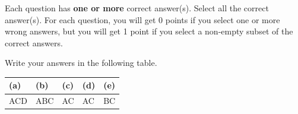 
Each question has \textbf{one or more} correct answer(s). Select all the correct answer(s). For each question, you will get 0 points if you select one or more wrong answers, but you will get 1 point if you select a non-empty subset of the correct answers.

Write your answers in the following table.

\begin{table}[h]
    \centering
    \renewcommand{\arraystretch}{1.25}
    \begin{tabular}{|p{2cm}|p{2cm}|p{2cm}|p{2cm}|p{2cm}|}
        \hline 
        (a) & (b) & (c) & (d) & (e)\\
        \hline
        ACD & ABC & AC & AC & BC \\
        \hline
    \end{tabular}
\end{table}

